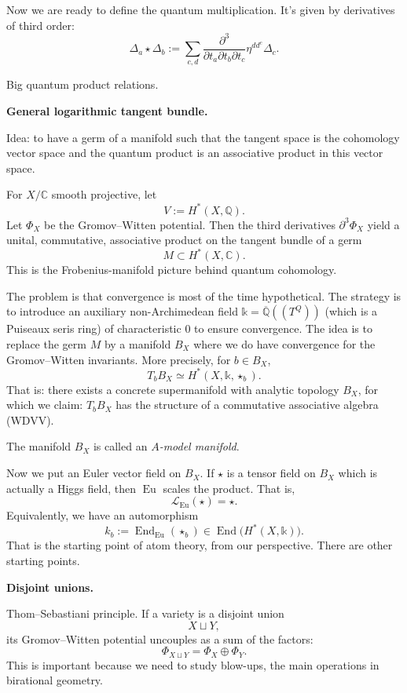 Now we are ready to define the quantum
multiplication.
It's given by derivatives of third order:
$$
\Delta_a \star \Delta_b 
:= \sum_{c,d}
\frac{\partial^3}{\partial t_a \partial
t_b \partial t_c}\eta^{dd^c}\Delta_c.
$$

Big quantum product relations.

\medskip\noindent
{\bf General logarithmic tangent
bundle.}

Idea: to have a germ of a manifold
such that the tangent space is the
cohomology vector space and the
quantum product is an associative
product in this vector space.

For $X/\mathbb{C}$ smooth
projective, let
$$
V:=H^*(X,\mathbb{Q}).
$$
Let $\Phi_X$ be the
Gromov--Witten potential.
Then the third derivatives
$\partial^3\Phi_X$ yield a unital,
commutative, associative product on
the tangent bundle of a germ
$$
M\subset H^*(X,\mathbb{C}).
$$
This is the Frobenius-manifold
picture behind quantum cohomology.

\medskip\noindent
The problem is that convergence is
most of the time hypothetical.
The strategy is to introduce an
auxiliary non-Archimedean field
$\mathbb{k}=\overline{\mathbb{Q}}((T^Q))$
(which is a Puiseaux seris ring) 
of characteristic $0$
to ensure convergence.
The idea is to replace the germ
$M$ by a manifold $B_X$ where we do
have convergence for the
Gromov--Witten invariants.
More precisely, for $b \in B_X$,
$$
T_bB_X\simeq H^*(X,\mathbb{k},\star_b).
$$
That is: there exists a concrete
supermanifold
with analytic topology $B_X$, for which
we claim: $T_bB_X$ has the structure
of a commutative associative algebra (WDVV).

\begin{definition}
\label{definition-manifold-b}
The manifold $B_X$ is called an
{\it $A$-model manifold}.
\end{definition}

Now we put an Euler vector field
on $B_X$.
If $\star$ is a tensor field on $B_X$
which is actually a Higgs field,
then $\operatorname{Eu}$ scales the
product.
That is,
$$
\mathcal{L}_{\operatorname{Eu}}(\star)=\star.
$$
Equivalently, we have an
automorphism
$$
k_b:=\operatorname{End}_{\operatorname{Eu}}
(\star_b)
\in \operatorname{End}
\bigl(H^*(X,\mathbb{k})\bigr).
$$
That is the starting point of atom
theory, from our perspective.
There are other starting points.

\medskip\noindent
{\bf Disjoint unions.}

Thom--Sebastiani principle.
If a variety is a disjoint union
$$
X\sqcup Y,
$$
its Gromov--Witten potential
uncouples as a sum of the factors:
$$
\Phi_{X\sqcup Y}
=
\Phi_X \oplus \Phi_Y.
$$
This is important because we need
to study blow-ups, the main
operations in birational geometry.

